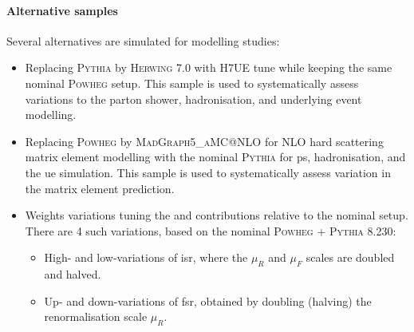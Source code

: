 \paragraph{Alternative samples} Several alternatives are simulated for modelling studies:
\begin{itemize}
  \item Replacing \textsc{Pythia} by \textsc{Herwing} 7.0 with H7UE tune \cite{herwig7R} while keeping the same nominal \textsc{Powheg} setup. This sample is used to systematically assess variations to the parton shower, hadronisation, and underlying event modelling.
  \item Replacing \textsc{Powheg} by \textsc{MadGraph5\_aMC@NLO} \cite{madgraph} for NLO hard scattering matrix element modelling with the nominal \textsc{Pythia} for \gls{ps}, hadronisation, and the \gls{ue} simulation. This sample is used to systematically assess variation in the matrix element prediction.
  \item Weights variations tuning the  and  contributions relative to the nominal setup. There are 4 such variations, based on the nominal \textsc{Powheg} + \textsc{Pythia} 8.230:
  \begin{itemize}
    \item High- and low-variations of \gls{isr}, where the $\mu_R$ and $\mu_F$ scales are doubled and halved. %
    \item Up- and down-variations of \gls{fsr}, obtained by doubling (halving) the renormalisation scale $\mu_{R}$. 
  \end{itemize}
\end{itemize} 

